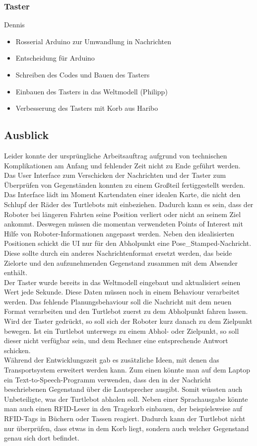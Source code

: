 \documentclass[a4paper,12pt,headsepline]{scrartcl}
\begin{document}
	\subsubsection{Taster}
		Dennis\\
		\begin{itemize}
			\item Rosserial Arduino zur Umwandlung in Nachrichten
			\item Entscheidung für Arduino
			\item Schreiben des Codes und Bauen des Tasters
			\item Einbauen des Tasters in das Weltmodell (Philipp)
			\item Verbesserung des Tasters mit Korb aus Haribo
		\end{itemize}
	
	\subsection{Ausblick}
		Leider konnte der ursprüngliche Arbeitsauftrag aufgrund von technischen Komplikationen am Anfang und fehlender Zeit nicht zu Ende geführt werden. Das User Interface zum Verschicken der Nachrichten und der Taster zum Überprüfen von Gegenständen konnten zu einem Großteil fertiggestellt werden.\\
		Das Interface lädt im Moment Kartendaten einer idealen Karte, die nicht den Schlupf der Räder des Turtlebots mit einbeziehen. Dadurch kann es sein, dass der Roboter bei längeren Fahrten seine Position verliert oder nicht an seinem Ziel ankommt. Deswegen müssen die momentan verwendeten Points of Interest mit Hilfe von Roboter-Informationen angepasst werden. Neben den idealisierten Positionen schickt die UI nur für den Abholpunkt eine \glqq Pose{\_}Stamped\grqq-Nachricht. Diese sollte durch ein anderes Nachrichtenformat ersetzt werden, das beide Zielorte und den aufzunehmenden Gegenstand zusammen mit dem Absender enthält.\\
		Der Taster wurde bereits in das Weltmodell eingebaut und aktualisiert seinen Wert jede Sekunde. Diese Daten müssen noch in einem Behaviour verarbeitet werden. Das fehlende Planungsbehaviour soll die Nachricht mit dem neuen Format verarbeiten und den Turtlebot zuerst zu dem Abholpunkt fahren lassen. Wird der Taster gedrückt, so soll sich der Roboter kurz danach zu dem Zielpunkt bewegen. Ist ein Turtlebot unterwegs zu einem Abhol- oder Zielpunkt, so soll dieser nicht verfügbar sein, und dem Rechner eine entsprechende Antwort schicken.\\
		Während der Entwicklungszeit gab es zusätzliche Ideen, mit denen das Transportsystem erweitert werden kann. Zum einen könnte man auf dem Laptop ein Text-to-Speech-Programm verwenden, dass den in der Nachricht beschriebenen Gegenstand über die Lautsprecher ausgibt. Somit wüssten auch Unbeteiligte, was der Turtlebot abholen soll. Neben einer Sprachausgabe könnte man auch einen RFID-Leser in den Tragekorb einbauen, der beispielsweise auf RFID-Tags in Büchern oder Tassen reagiert. Dadurch kann der Turtlebot nicht nur überprüfen, dass etwas in dem Korb liegt, sondern auch welcher Gegenstand genau sich dort befindet.
		
\end{document}

